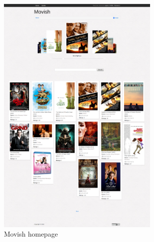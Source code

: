 \begin{figure}
  \centering
  \includegraphics[width=0.7\textwidth]{figures/movish-homepage.png}
  \caption{Movish homepage}
  \label{fig:movish_homepage}
\end{figure}